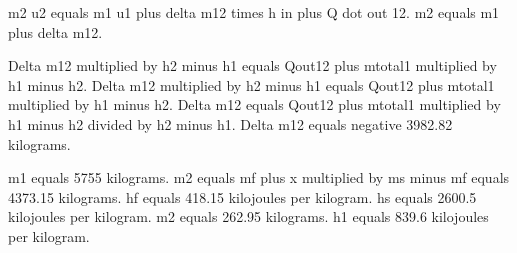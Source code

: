 m2 u2 equals m1 u1 plus delta m12 times h in plus Q dot out 12.  
m2 equals m1 plus delta m12.

Delta m12 multiplied by h2 minus h1 equals Qout12 plus mtotal1 multiplied by h1 minus h2.  
Delta m12 multiplied by h2 minus h1 equals Qout12 plus mtotal1 multiplied by h1 minus h2.  
Delta m12 equals Qout12 plus mtotal1 multiplied by h1 minus h2 divided by h2 minus h1.  
Delta m12 equals negative 3982.82 kilograms.  

m1 equals 5755 kilograms.  
m2 equals mf plus x multiplied by ms minus mf equals 4373.15 kilograms.  
hf equals 418.15 kilojoules per kilogram.  
hs equals 2600.5 kilojoules per kilogram.  
m2 equals 262.95 kilograms.  
h1 equals 839.6 kilojoules per kilogram.